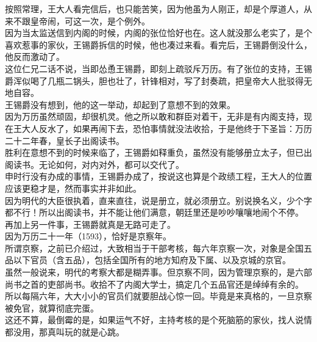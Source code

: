 \begin{multicols}{\theparacolNo}
按照常理，王大人看完信后，也只能苦笑，因为他虽为人刚正，却是个厚道人，从来不跟皇帝闹，可这一次，是个例外。\\

因为当太监送信到内阁的时候，内阁的张位恰好也在。这人就没那么老实了，是个喜欢惹事的家伙，王锡爵拆信的时候，他也凑过来看。看完后，王锡爵倒没什么，他反而激动了。\\

这位仁兄二话不说，当即怂恿王锡爵，即刻上疏驳斥万历。有了张位的支持，王锡爵浑似喝了几瓶二锅头，胆也壮了，针锋相对，写了封奏疏，把皇帝大人批驳得无地自容。\\

王锡爵没有想到，他的这一举动，却起到了意想不到的效果。\\

因为万历虽然顽固，却很机灵。他之所以敢和群臣对着干，无非是有内阁支持，现在王大人反水了，如果再闹下去，恐怕事情就没法收拾，于是他终于下圣旨：万历二十二年春，皇长子出阁读书。\\

胜利在意想不到的时候来临了，王锡爵如释重负，虽然没有能够册立太子，但已出阁读书。无论如何，对内对外，都可以交代了。\\

申时行没有办成的事情，王锡爵办成了，按说这也算是个政绩工程，王大人的位置应该更稳才是，然而事实并非如此。\\

因为明代的大臣很执着，直来直往，说是册立，就必须册立。别说换名义，少个字都不行！所以出阁读书，并不能让他们满意，朝廷里还是吵吵嚷嚷地闹个不停。\\

再加上另一件事，王锡爵就真是无路可走了。\\

因为万历二十一年（1593），恰好是京察年。\\

所谓京察，之前已介绍过，大致相当于干部考核，每六年京察一次，对象是全国五品以下官员（含五品），包括全国所有的地方知府及下属、以及京城的京官。\\

虽然一般说来，明代的考察大都是糊弄事。但京察不同，因为管理京察的，是六部尚书之首的吏部尚书。收拾不了内阁大学士，搞定几个五品官还是绰绰有余的。\\

所以每隔六年，大大小小的官员们就要胆战心惊一回。毕竟是来真格的，一旦京察被免官，就算彻底完蛋。\\

这还不算，最倒霉的是，如果运气不好，主持考核的是个死脑筋的家伙，找人说情都没用，那真叫玩的就是心跳。\\


\end{multicols}
